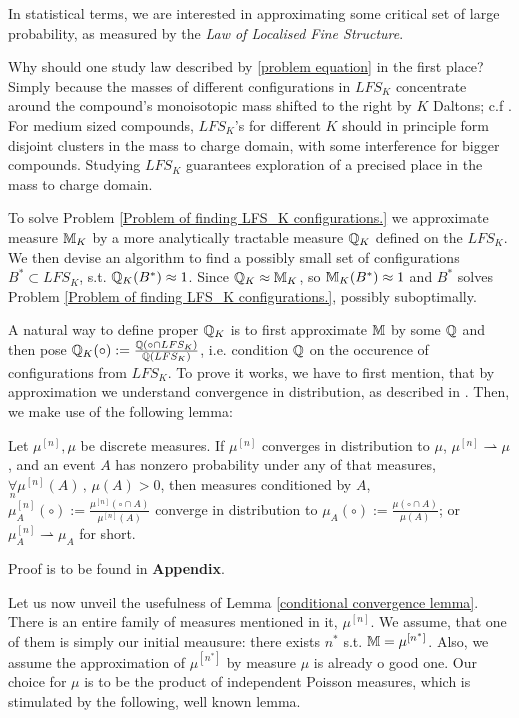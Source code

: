 In statistical terms, we are interested in approximating some critical set of large probability, as measured by the {\it Law of Localised Fine Structure}. 


Why should one study law described by \eqref{problem equation} in the first place? Simply because the masses of different configurations in $LFS_K$ concentrate around the compound's monoisotopic mass shifted to the right by $K$ Daltons; c.f \cite{Hughey2001KendrickMassDefect}. For medium sized compounds, $LFS_K$'s for different $K$ should in principle form disjoint clusters in the mass to charge domain, with some interference for bigger compounds. Studying $LFS_K$ guarantees exploration of a precised place in the mass to charge domain.


To solve Problem \ref{Problem of finding LFS_K configurations.} we approximate measure $\mathbb{M}_K$ by a more analytically tractable measure $\mathbb{Q}_K$ defined on the $LFS_K$. We then devise an algorithm to find a possibly small set of configurations $B^* \subset LFS_K$, s.t. $\mathbb{Q}_K (B^*) \approx 1$. Since $\mathbb{Q}_K \approx \mathbb{M}_K$, so $\mathbb{M}_K (B^*) \approx 1$ and $B^*$ solves Problem \ref{Problem of finding LFS_K configurations.}, possibly suboptimally.


A natural way to define proper $\mathbb{Q}_K$ is to first approximate $\mathbb{M}$ by some $\mathbb{Q}$ and then pose $\mathbb{Q}_K (\circ) := \frac{\mathbb{Q} (\circ \cap LFS_K) }{\mathbb{Q}(LFS_K)}$, i.e. condition $\mathbb{Q}$ on the occurence of configurations from $LFS_K$. To prove it works, we have to first mention, that by approximation we understand convergence in distribution, as described in \cite{Kallenberg2002FoundationsOfModernProbability}. Then, we make use of the following lemma: 

\begin{lemma}\label{conditional convergence lemma}
	Let $\mu^{[n]}, \mu$ be discrete measures. If $\mu^{[n]}$ converges in distribution to $\mu$, $\mu^{[n]} \rightharpoonup  \mu$, and an event $A$ has nonzero probability under any of that measures, $\underset{n}{\forall} \mu^{[n]}(A)\,,\, \mu(A) > 0$, then measures conditioned by $A$, $\mu^{[n]}_A (\circ) := \frac{\mu^{[n]} ( \circ \cap A)}{\mu^{[n]}(A)}$ converge in distribution to $\mu_A (\circ) := \frac{ \mu( \circ \cap A) }{ \mu(A) }$; or $\mu^{[n]}_A \rightharpoonup \mu_A$ for short.
\end{lemma}  
Proof is to be found in \textbf{Appendix}.  


Let us now unveil the usefulness of Lemma \ref{conditional convergence lemma}. There is an entire family of measures mentioned in it, $\mu^{[n]}$. We assume, that one of them is simply our initial meausure: there exists $n^*$ s.t. $\mathbb{M} = \mu^{[n^*]}$. Also, we assume the approximation of $\mu^{[n^*]}$ by measure $\mu$ is already o good one. Our choice for $\mu$ is to be the product of independent Poisson measures, which is stimulated by the following, well known lemma.


